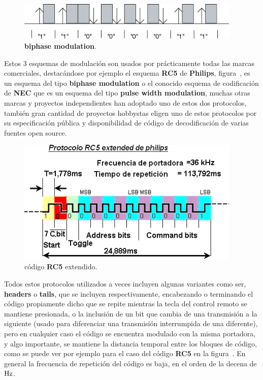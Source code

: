 \begin{figure}[H]
	\centering
	\includegraphics[width=0.95\textwidth]{img/IR/biphase.png}
	\caption{\footnotesize{\textbf{biphase modulation}.}}
	\label{fig:biphase_modulation}
\end{figure}


Estos $3$ esquemas de modulación son usados por prácticamente todas las marcas comerciales, destacándose por ejemplo el esquema \textbf{RC5} de \textbf{Philips}, figura~, es un esquema del tipo \textbf{biphase modulation} o el conocido esquema de codificación de \textbf{NEC} que es un esquema del tipo \textbf{pulse width modulation}, muchas otras marcas y proyectos independientes han adoptado uno de estos dos protocolos, también gran cantidad de proyectos hobbystas eligen uno de estos protocolos por su especificación pública y disponibilidad de código de decodificación de varias fuentes open source.\\

\begin{figure}[H]
	\centering
	\includegraphics[width=0.95\textwidth]{img/IR/RC5_Ext.png}
	\caption{\footnotesize{código \textbf{RC5} extendido.}}
	\label{fig:RC5_coding}
\end{figure}

Todos estos protocolos utilizados a veces incluyen algunas variantes como ser, \textbf{headers} o \textbf{tails}, que se incluyen respectivamente, encabezando o terminando el código propiamente dicho que se repite mientras la tecla del control remoto se mantiene presionada, o la inclusión de un bit que cambia de una transmisión a la siguiente (usado para diferenciar una transmisión interrumpida de una diferente), pero en cualquier caso el código se encuentra modulado con la misma portadora, y algo importante, se mantiene la distancia temporal entre los bloques de código, como se puede ver por ejemplo para el caso del código \textbf{RC5} en la figura~. En general la frecuencia de repetición del código es baja, en el orden de la decena de $\si[per-mode=symbol]{\hertz}$.


